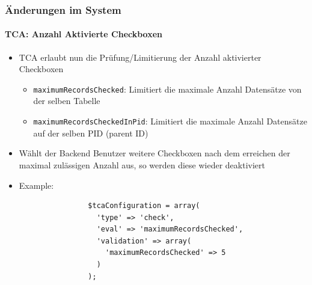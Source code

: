 \begin{frame}[fragile]
	\frametitle{Änderungen im System}
	\framesubtitle{TCA: Anzahl Aktivierte Checkboxen}

	\lstset{
		basicstyle=\tiny\ttfamily
	}

	\begin{itemize}
		\item TCA erlaubt nun die Prüfung/Limitierung der Anzahl aktivierter Checkboxen

			\begin{itemize}
				\item \texttt{maximumRecordsChecked}:\newline
					Limitiert die maximale Anzahl Datensätze von der selben Tabelle
				\item \texttt{maximumRecordsCheckedInPid}:\newline
					Limitiert die maximale Anzahl Datensätze auf der selben PID (parent ID)
			\end{itemize}

		\item Wählt der Backend Benutzer weitere Checkboxen nach dem erreichen der maximal zulässigen Anzahl aus, so werden diese wieder deaktiviert

		\item Example:

			\begin{lstlisting}
				$tcaConfiguration = array(
				  'type' => 'check',
				  'eval' => 'maximumRecordsChecked',
				  'validation' => array(
				    'maximumRecordsChecked' => 5
				  )
				);
			\end{lstlisting}

	\end{itemize}

\end{frame}


